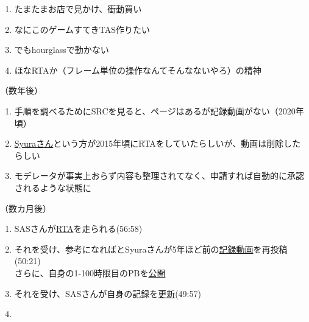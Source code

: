\begin{enumerate}[label={\sarrow}]
\item たまたまお店で見かけ、衝動買い
\item なにこのゲームすてきTAS作りたい
\item でもhourglassで動かない
\item ほなRTAか（フレーム単位の操作なんてそんなないやろ）の精神
\end{enumerate}
（数年後）
\begin{enumerate}[label={\sarrow}]
\item 手順を調べるためにSRCを見ると、ページはあるが記録動画がない（2020年頃）
\item \href{https://www.speedrun.com/users/Syura}{Syuraさん}という方が2015年頃にRTAをしていたらしいが、動画は削除したらしい
\item モデレータが事実上おらず内容も整理されてなく、申請すれば自動的に承認されるような状態に
\end{enumerate}
（数カ月後）
\begin{enumerate}[label={\sarrow}]
\item SASさんが\href{https://www.speedrun.com/komeiji_satori_no_jousou_kyouiku/runs/znol46vy}{RTA}を走られる(56:58)
\item それを受け、参考になればとSyuraさんが5年ほど前の\href{https://www.speedrun.com/komeiji_satori_no_jousou_kyouiku/runs/m3n4v8qy}{記録動画}を再投稿(50:21)\\
      さらに、自身の1-100時限目のPBを\href{https://pastebin.com/0nH3mJSZ}{公開}
\item それを受け、SASさんが自身の記録を\href{https://www.speedrun.com/komeiji_satori_no_jousou_kyouiku/runs/m3ro3edm}{更新}(49:57)
\item
\end{enumerate}





\begin{appendices}
\end{appendices}

